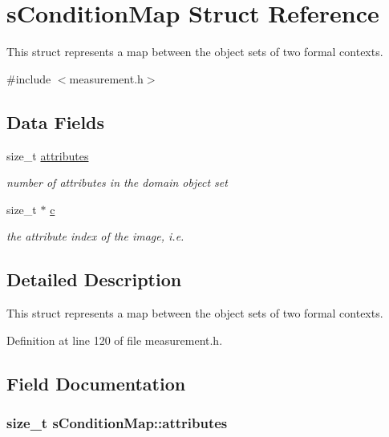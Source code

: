 \hypertarget{structsConditionMap}{\section{s\-Condition\-Map \-Struct \-Reference}
\label{structsConditionMap}
}


\-This struct represents a map between the object sets of two formal contexts.  




{\ttfamily \#include $<$measurement.\-h$>$}

\subsection*{\-Data \-Fields}
\begin{DoxyCompactItemize}
\item 
size\-\_\-t \hyperlink{structsConditionMap_a6a6975dfaba87cd345610cf6526ede4e}{attributes}
\begin{DoxyCompactList}\small\item\em number of attributes in the domain object set \end{DoxyCompactList}\item 
size\-\_\-t $\ast$ \hyperlink{structsConditionMap_a8fba8e129aa41cc4fd2f1898e83c2f28}{c}
\begin{DoxyCompactList}\small\item\em the attribute index of the image, i.\-e. \end{DoxyCompactList}\end{DoxyCompactItemize}


\subsection{\-Detailed \-Description}
\-This struct represents a map between the object sets of two formal contexts. 

\-Definition at line 120 of file measurement.\-h.



\subsection{\-Field \-Documentation}
\hypertarget{structsConditionMap_a6a6975dfaba87cd345610cf6526ede4e}{
\subsubsection[{attributes}]{\setlength{\rightskip}{0pt plus 5cm}size\-\_\-t {\bf s\-Condition\-Map\-::attributes}}}\label{structsConditionMap_a6a6975dfaba87cd345610cf6526ede4e}


